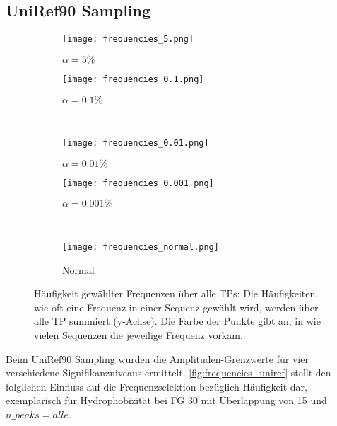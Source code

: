     \subsection{UniRef90 Sampling} %
        \label{sub:uniref90_results}
        \begin{figure}[H]
            \centering
            \begin{subfigure}{.45\textwidth}
                \texttt{[image: frequencies\_5.png]}
                \caption{$\alpha=5\%$}
                \label{fig:frequencies_5}
            \end{subfigure}
            \begin{subfigure}{.45\textwidth}
                \texttt{[image: frequencies\_0.1.png]}
                \caption{$\alpha=0.1\%$}
                \label{fig:frequencies_0.1}
            \end{subfigure}\\
            \begin{subfigure}{.45\textwidth}
                \texttt{[image: frequencies\_0.01.png]}
                \caption{$\alpha=0.01\%$}
                \label{fig:frequencies_0.01}
            \end{subfigure}
            \begin{subfigure}{.45\textwidth}
                \texttt{[image: frequencies\_0.001.png]}
                \caption{$\alpha=0.001\%$}
                \label{fig:frequencies_0.001}
            \end{subfigure}\\
            \begin{subfigure}{.45\textwidth}
                \texttt{[image: frequencies\_normal.png]}
                \caption{Normal}
                \label{fig:frequencies_normal}
            \end{subfigure}
            \caption[Häufigkeit gewählter Frequenzen über alle \aclp{TP} ]{Häufigkeit gewählter Frequenzen über alle \aclp{TP}: Die Häufigkeiten, wie oft eine Frequenz in einer Sequenz gewählt wird, werden über alle \ac{TP} summiert (y-Achse). Die Farbe der Punkte gibt an, in wie vielen Sequenzen die jeweilige Frequenz vorkam.}
            \label{fig:frequencies_uniref}
        \end{figure}

        Beim UniRef90 Sampling wurden die Amplituden-Grenzwerte für vier verschiedene Signifikanzniveaus ermittelt. \autoref{fig:frequencies_uniref} stellt den folglichen Einfluss auf die Frequenzselektion bezüglich Häufigkeit dar, exemplarisch für Hydrophobizität bei \ac{FG} 30 mit Überlappung von 15 und $n\_peaks = alle$.


